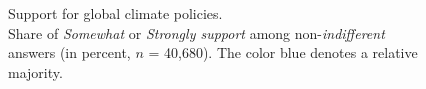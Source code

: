 \begin{figure} %
  \caption{Support for global climate policies. \\ Share of \textit{Somewhat} or \textit{Strongly support} among non-\textit{indifferent} answers (in percent, $n$ = 40,680). The color blue denotes a relative majority. } %
  \label{fig:oecd}
\end{figure}

